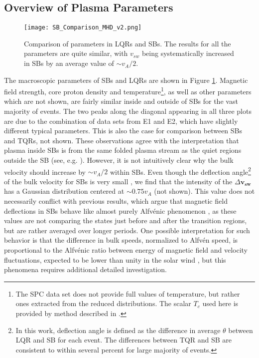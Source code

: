 \documentclass[]{aastex62}
\begin{document}

\subsection{Overview of Plasma Parameters}
\label{sec:Results_MHD}

\begin{figure}
\centering
\texttt{[image: SB\_Comparison\_MHD\_v2.png]}
\caption{Comparison of parameters in LQRs and SBs. The results for all the parameters are quite similar, with $v_{sw}$ being systematically increased in SBs by an average value of $\sim v_A/2$.}
\label{fig:SB_Comparison}
\end{figure}


The macroscopic parameters of SBs and LQRs are shown in Figure \ref{fig:SB_Comparison}. Magnetic field strength, core proton density and temperature\footnote{The SPC data set does not provide full values of temperature, but rather ones extracted from the reduced distributions. The scalar $T_c$ used here is provided by method described in \citep{Huang_2020_ApJS}.}, as well as other parameters which are not shown, are fairly similar inside and outside of SBs for the vast majority of events. The two peaks along the diagonal appearing in all three plots are due to the combination of data sets from E1 and E2, which have slightly different typical parameters. This is also the case for comparison between SBs and TQRs, not shown. These observations agree with the interpretation that plasma inside SBs is from the same folded plasma stream as the quiet regions outside the SB (see, e.g. \citep{Yamauchi_2004_JGRA,Tenerani_2020_ApJS,Fisk_2020ApJL,Wooley_2020_MNRAS}). However, it is not intuitively clear why the bulk velocity should increase by $\sim v_A/2$ within SBs. Even though the deflection angle\footnote{In this work, deflection angle is defined as the difference in average $\theta$ between LQR and SB for each event. The differences between TQR and SB are consistent to within several percent for large majority of events.} of the bulk velocity for SBs is very small \citep{Kasper_2019_Nature}, we find that the intensity of the $\Delta\mathbf{ v_{sw}}$ has a Gaussian distribution centered at $\sim 0.75 v_A$ (not shown). This value does not necessarily conflict with previous results, which argue that magnetic field deflections in SBs behave like almost purely Alfv\'enic phenomenon \citep{Yamauchi_2004_JGRA,Gosling_2011_ApJ,Matteini_2015_ApJ,Horbury_2018_MNRAS}, as these values are not comparing the states just before and after the transition regions, but are rather averaged over longer periods. One possible interpretation for such behavior is that the difference in bulk speeds, normalized to Alfv\'en speed, is proportional to the Alfv\'enic ratio between energy of magnetic field and velocity fluctuations, expected to be lower than unity in the solar wind \citep{Matteini_2014_GRL}, but this phenomena requires additional detailed investigation. 
\end{document}

